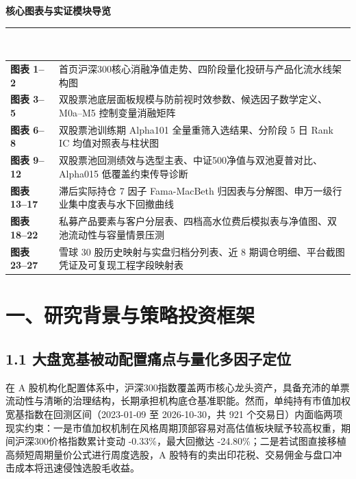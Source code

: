 \documentclass[12pt,a4paper]{article}
\let\origsection\section
\renewcommand{\section}[1]{\needspace{6.5\baselineskip}\origsection{#1}}
\let\origsubsection\subsection
\renewcommand{\subsection}[1]{\needspace{4\baselineskip}\origsubsection{#1}}
\begin{document}
\vspace{10pt}
{\setlength{\parindent}{0pt}
{\sffamily\bfseries\fontsize{11pt}{15pt}\selectfont\textcolor{Primary}{核心图表与实证模块导览}}\\[2pt]
{\color{RuleMuted}\rule{\textwidth}{0.5pt}}\\[4pt]
{\fontsize{8.2pt}{11.5pt}\selectfont\color{SubInk}
\begin{tabularx}{\textwidth}{@{}l X@{}}
  \textbf{图表 1--2} & 首页沪深300核心消融净值走势、四阶段量化投研与产品化流水线架构图 \\
  \textbf{图表 3--5} & 双股票池底层面板规模与防前视时效参数、候选因子数学定义、M0a--M5 控制变量消融矩阵 \\
  \textbf{图表 6--8} & 双股票池训练期 Alpha101 全量重筛入选结果、分阶段 5 日 Rank IC 均值对照表与柱状图 \\
  \textbf{图表 9--12} & 双股票池回测绩效与选型主表、中证500净值与双池夏普对比、Alpha015 低覆盖约束传导诊断 \\
  \textbf{图表 13--17} & 滞后实际持仓 7 因子 Fama-MacBeth 归因表与分解图、申万一级行业集中度表与水下回撤曲线 \\
  \textbf{图表 18--22} & 私募产品要素与客户分层表、四档高水位费后模拟表与净值图、双池流动性与容量情景压测 \\
  \textbf{图表 23--27} & 雪球 30 股历史映射与实盘归档分列表、近 8 期调仓明细、平台截图凭证及可复现工程字段映射表 \\
\end{tabularx}\par}
}

\newpage

\section{一、研究背景与策略投资框架}

\subsection{1.1 大盘宽基被动配置痛点与量化多因子定位}

在 A 股机构化配置体系中，沪深300指数覆盖两市核心龙头资产，具备充沛的单票流动性与清晰的治理结构，长期承担机构底仓基准职能。然而，单纯持有市值加权宽基指数在回测区间（2023-01-09 至 2026-10-30，共 921 个交易日）内面临两项现实约束：一是市值加权机制在风格周期顶部容易对高估值板块赋予较高权重，期间沪深300价格指数累计变动 -0.33\%，最大回撤达 -24.80\%；二是若试图直接移植高频短周期量价公式进行周度选股，A 股特有的卖出印花税、交易佣金与盘口冲击成本将迅速侵蚀选股毛收益。
\end{document}
